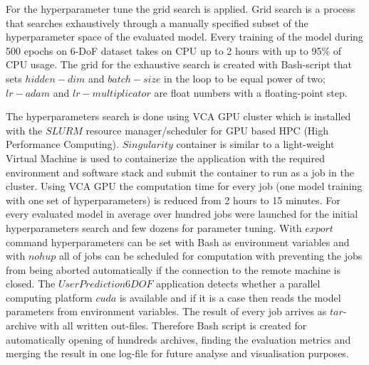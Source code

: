 For the hyperparameter tune the grid search is applied. Grid search is a process that searches exhaustively through a manually specified subset of the hyperparameter space of the evaluated model. Every training of the model during 500 epochs on 6-DoF dataset takes on CPU up to 2 hours with up to 95\% of CPU usage. The grid for the exhaustive search is created with Bash-script that sets $hidden-dim$ and $batch-size$ in the loop to be equal power of two; $lr-adam$ and $lr-multiplicator$ are float numbers with a floating-point step. 

The hyperparameters search is done using VCA GPU cluster which is installed with the $SLURM$ resource manager/scheduler for GPU based HPC (High Performance Computing). $Singularity$ container is similar to a light-weight Virtual Machine is used to containerize the application with the required environment and software stack and submit the container to run as a job in the cluster. Using VCA GPU the computation time for every job (one model training with one set of hyperparameters) is reduced from 2 hours to 15 minutes. For every evaluated model in average over hundred jobs were launched for the initial hyperparameters search and few dozens for parameter tuning. With $export$ command hyperparameters can be set with Bash as environment variables and with $nohup$ all of jobs can be scheduled for computation with preventing the jobs from being aborted automatically if the connection to the remote machine is closed. The $UserPrediction6DOF$ application detects whether a parallel computing platform $cuda$ is available and if it is a case then reads the model parameters from environment variables. The result of every job arrives as $tar$-archive with all written out-files. Therefore Bash script is created for automatically opening of hundreds archives, finding the evaluation metrics and merging the result in one log-file for future analyse and visualisation purposes.   